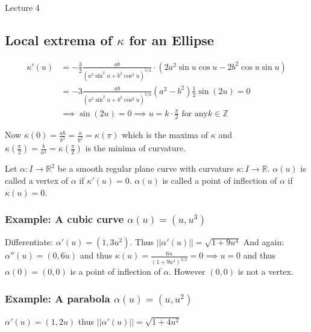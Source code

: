\begin{center}

Lecture 4

\end{center}

\subsection{Local extrema of $\kappa$ for an Ellipse}

\begin{align*}
\kappa '(u) &= - \frac{3}{2} \frac{ab}{(a^2 \sin^2 u + b^2 \cos^2 u)^{5/2}} \cdot (2a^2 \sin u \cos u - 2b^2 \cos u \sin u) \\
&= -3 \frac{ab}{(a^2 \sin^2 u + b^2 \cos^2 u)^{5/2}} (a^2 - b^2) \frac{1}{2} \sin (2u) = 0 \\
&\implies \sin (2u) = 0 \implies u = k \cdot \frac{\pi}{2} \, \, \text{for any} k \in \mathbb{Z}
\end{align*}

Now $\kappa(0) = \frac{ab}{b^3}= \frac{a}{b^2} = \kappa(\pi)$ which is the maxima of $\kappa$ and $\kappa(\frac{\pi}{2}) = \frac{b}{a^2} = \kappa(\frac{\pi}{2})$ is the minima of curvature.

\vspace{\baselineskip}

Let $\alpha : I \rightarrow \mathbb{R}^2$ be a smooth regular plane curve with curvature $\kappa : I \rightarrow \mathbb{R}$. $\alpha(u)$ is called a vertex of $\alpha$ if $\kappa'(u) = 0$. $\alpha(u)$ is called a point of inflection of $\alpha$ if $\kappa(u) = 0$.

\subsubsection*{Example: A cubic curve $\alpha(u) = (u, u^3)$}

Differentiate: $\alpha'(u) = (1, 3u^2)$. Thus $||\alpha'(u)|| = \sqrt{1+9u^4}$ And again: $\alpha''(u) = (0, 6u)$ and thus $\kappa(u) = \frac{6u}{(1+9u^4)^{3/2}} = 0 \implies u = 0$ and thus $\alpha(0) = (0,0)$ is a point of inflection of $\alpha$. However $(0,0)$ is not a vertex.

\subsubsection{Example: A parabola $\alpha(u) = (u, u^2)$}

$\alpha'(u) = (1, 2u)$ thus $||\alpha'(u)|| = \sqrt{1+4u^2}$

